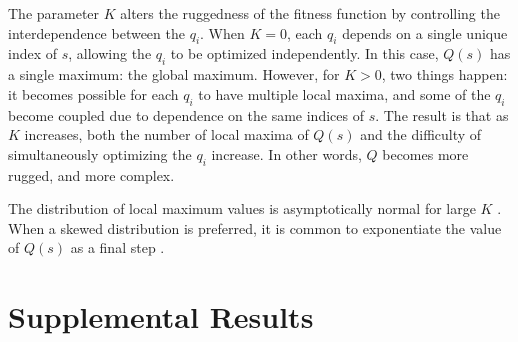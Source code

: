 \documentclass[twocolumn,10pt]{article}
\begin{document}
The parameter $K$ alters the ruggedness of the fitness function by controlling the interdependence between the $q_i$.
When $K = 0$, each $q_i$ depends on a single unique index of $s$,
allowing the $q_i$ to be optimized independently.
In this case, $Q(s)$ has a single maximum: the global maximum.
However, for $K > 0$, two things happen: it becomes possible for each $q_i$ to have multiple local maxima, and some of the $q_i$ become coupled due to dependence on the same indices of $s$.
The result is that as $K$ increases, both the number of local maxima of $Q(s)$ \cite{weinberger_local_1991} and the difficulty of simultaneously optimizing the $q_i$ increase.
In other words, $Q$ becomes more rugged, and more complex.

The distribution of local maximum values is asymptotically normal for large $K$ \cite{weinberger_local_1991}.
When a skewed distribution is preferred, it is common to exponentiate the value of $Q(s)$ as a final step \cite{lazer_network_2007, barkoczi_social_2016, gomez_clustering_2019}.

\section{Supplemental Results}





\end{document}
